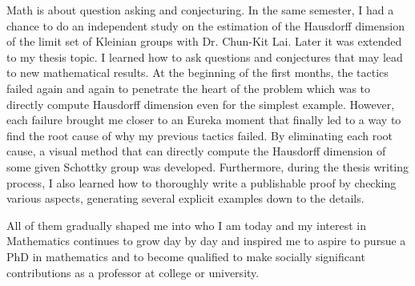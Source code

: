 \documentclass[11pt]{amsart}
\begin{document}
Math is about question asking and conjecturing. In the same semester, I had a chance to do an independent study on the estimation of the Hausdorff dimension of the limit set of Kleinian groups with Dr. Chun-Kit Lai. Later it was extended to my thesis topic. I learned how to ask questions and conjectures that may lead to new mathematical results. At the beginning of the first months, the tactics failed again and again to penetrate the heart of the problem which was to directly compute Hausdorff dimension even for the simplest example. However, each failure brought me closer to an Eureka moment that finally led to a way to find the root cause of why my previous tactics failed. By eliminating each root cause, a visual method that can directly compute the Hausdorff dimension of some given Schottky group was developed. Furthermore, during the thesis writing process, I also learned how to thoroughly write a publishable proof by checking various aspects, generating several explicit examples down to the details.


All of them gradually shaped me into who I am today and my interest in Mathematics continues to grow day by day and inspired me to aspire to pursue a PhD in mathematics and to become qualified to make socially significant contributions as a professor at college or university.
\end{document}
